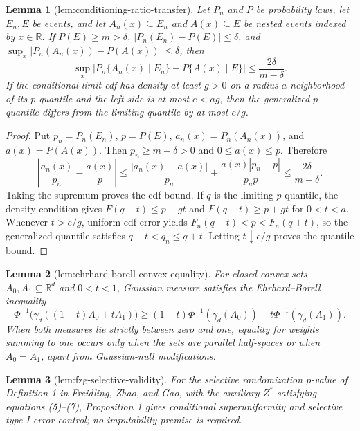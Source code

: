 \documentclass{article}
\newtheorem{lemma}{Lemma}
\begin{document}
\begin{lemma}[lem:conditioning-ratio-transfer]\label{lem:conditioning-ratio-transfer}
Let \(P_n\) and \(P\) be probability laws, let \(E_n,E\) be events, and let \(A_n(x)\subseteq E_n\) and \(A(x)\subseteq E\) be nested events indexed by \(x\in\mathbb R\). If \(P(E)\ge m>\delta\), \(\lvert P_n(E_n)-P(E)\rvert\le\delta\), and \(\sup_x\lvert P_n(A_n(x))-P(A(x))\rvert\le\delta\), then
\[
\sup_x\left\lvert P_n\{A_n(x)\mid E_n\}-P\{A(x)\mid E\}\right\rvert\le \frac{2\delta}{m-\delta}.
\]
If the conditional limit cdf has density at least \(g>0\) on a radius-\(a\) neighborhood of its \(p\)-quantile and the left side is at most \(e<ag\), then the generalized \(p\)-quantile differs from the limiting quantile by at most \(e/g\).
\end{lemma}
\begin{proof}
Put \(p_n=P_n(E_n)\), \(p=P(E)\), \(a_n(x)=P_n(A_n(x))\), and \(a(x)=P(A(x))\).  Then \(p_n\ge m-\delta>0\) and \(0\le a(x)\le p\).  Therefore
\[
\left|\frac{a_n(x)}{p_n}-\frac{a(x)}p\right|
\le\frac{|a_n(x)-a(x)|}{p_n}
+\frac{a(x)|p_n-p|}{p_np}
\le\frac{2\delta}{m-\delta}.
\]
Taking the supremum proves the cdf bound.  If \(q\) is the limiting \(p\)-quantile, the density condition gives \(F(q-t)\le p-gt\) and \(F(q+t)\ge p+gt\) for \(0<t<a\).  Whenever \(t>e/g\), uniform cdf error yields \(F_n(q-t)<p<F_n(q+t)\), so the generalized quantile satisfies \(q-t<q_n\le q+t\).  Letting \(t\downarrow e/g\) proves the quantile bound.
\end{proof}

\begin{lemma}[lem:ehrhard-borell-convex-equality]\label{lem:ehrhard-borell-convex-equality}
For closed convex sets \(A_0,A_1\subseteq\mathbb R^d\) and \(0<t<1\), Gaussian measure satisfies the Ehrhard--Borell inequality
\[
\Phi^{-1}\!\bigl(\gamma_d((1-t)A_0+tA_1)\bigr)\ge(1-t)\Phi^{-1}(\gamma_d(A_0))+t\Phi^{-1}(\gamma_d(A_1)).
\]
When both measures lie strictly between zero and one, equality for weights summing to one occurs only when the sets are parallel half-spaces or when \(A_0=A_1\), apart from Gaussian-null modifications.
\end{lemma}

\begin{lemma}[lem:fzg-selective-validity]\label{lem:fzg-selective-validity}
For the selective randomization \(p\)-value of Definition 1 in Freidling, Zhao, and Gao, with the auxiliary \(Z^*\) satisfying equations (5)--(7), Proposition 1 gives conditional superuniformity and selective type-I-error control; no imputability premise is required.
\end{lemma}
\end{document}
